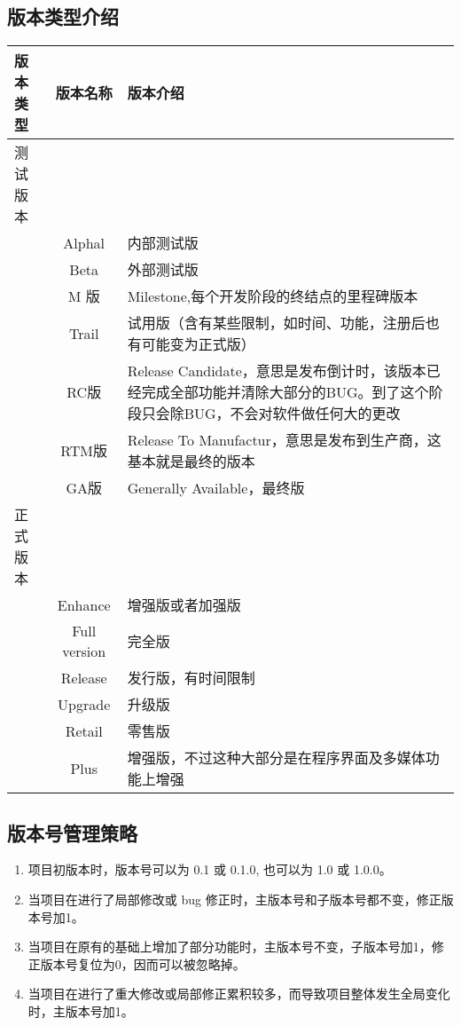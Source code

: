 \documentclass[UTF8,a4paper,12pt]{article}
\begin{document}
	\subsection{版本类型介绍}
	\begin{center}
		\begin{tabular}{|l|c|p{10cm}|}  
			\hline
			版本类型 & 版本名称 & 版本介绍 \\ \hline
			测试版本 & & \\ \hline
			& Alphal & 内部测试版 \\ \hline
			& Beta & 外部测试版 \\ \hline
			& M 版 & Milestone,每个开发阶段的终结点的里程碑版本 \\ \hline
			& Trail & 试用版（含有某些限制，如时间、功能，注册后也有可能变为正式版） \\ \hline
			& RC版 & Release Candidate，意思是发布倒计时，该版本已经完成全部功能并清除大部分的BUG。到了这个阶段只会除BUG，不会对软件做任何大的更改 \\ \hline
			& RTM版 & Release To Manufactur，意思是发布到生产商，这基本就是最终的版本 \\ \hline
			& GA版 & Generally Available，最终版 \\ \hline
			正式版本 & & \\ \hline
			& Enhance & 增强版或者加强版 \\ \hline
			& Full version & 完全版 \\ \hline
			& Release & 发行版，有时间限制 \\ \hline
			& Upgrade & 升级版 \\ \hline
			& Retail & 零售版 \\ \hline
			& Plus & 增强版，不过这种大部分是在程序界面及多媒体功能上增强 \\ \hline
		\end{tabular}
	\end{center}

	\subsection{版本号管理策略}
	\begin{enumerate}
	\item 项目初版本时，版本号可以为 0.1 或 0.1.0, 也可以为 1.0 或 1.0.0。
	\item 当项目在进行了局部修改或 bug 修正时，主版本号和子版本号都不变，修正版本号加1。
	\item 当项目在原有的基础上增加了部分功能时，主版本号不变，子版本号加1，修正版本号复位为0，因而可以被忽略掉。
	\item 当项目在进行了重大修改或局部修正累积较多，而导致项目整体发生全局变化时，主版本号加1。
	\end{enumerate}
\end{document}
